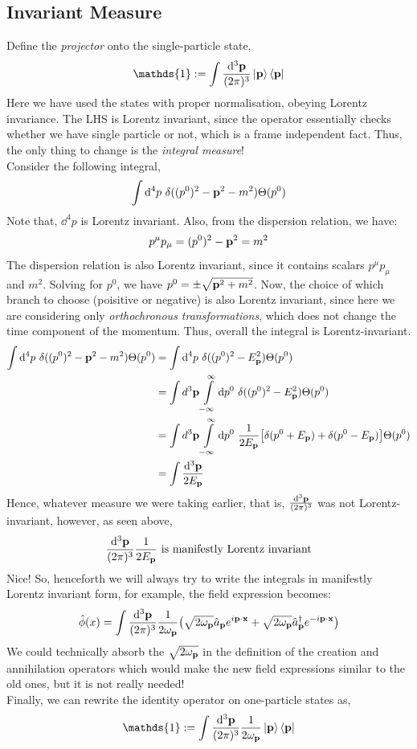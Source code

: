 \subsection{Invariant Measure}
Define the \textit{projector} onto the single-particle state,
$$\mathds{1} := \int \meas{\vb{p}} \ket{\vb{p}}\bra{\vb{p}}$$
Here we have used the states with proper normalisation, obeying Lorentz invariance. The LHS is Lorentz invariant, since the operator essentially checks whether we have single particle or not, which is a frame independent fact. Thus, the only thing to change is the \textit{integral measure}!\\[0.2cm]
Consider the following integral,
$$\int \dd^4 p \ \delta((p^0)^2 -\vb{{p}}^2- m^2) \Theta(p^0)$$
Note that, $\dd^4p$ is Lorentz invariant. Also, from the dispersion relation, we have:
$$p^\mu p_\mu = (p^0)^2 - \vb{{p}}^2 = m^2$$
The dispersion relation is also Lorentz invariant, since it contains scalars $p^\mu p_\mu$ and $m^2$. Solving for $p^0$, we have $p^0 = \pm\sqrt{\vb{{p}}^2 + m^2}$. Now, the choice of which branch to choose (poisitive or negative) is also Lorentz invariant, since here we are considering only \textit{orthochronous transformations}, which does not change the time component of the momentum. Thus, overall the integral is Lorentz-invariant.
\begin{align*}
   \int \dd^4 p \ \delta((p^0)^2 -\tvec{p}^2- m^2) \Theta(p^0)&=  \int \dd^4 p \ \delta((p^0)^2 -E_{\tvec{p}}^2)\Theta(p^0)\\
   &=\int d^3\vb{p} \int\limits_{-\infty}^\infty\dd p^0 \ \delta((p^0)^2 -E_{\tvec{p}}^2)\Theta(p^0) \\
   &=\int d^3\vb{p} \int\limits_{-\infty}^\infty \dd p^0 \ \frac{1}{2E_{\vb{p}}}\qty[\delta(p^0 +E_{\tvec{p}}) + \delta(p^0 -E_{\tvec{p}})]\Theta(p^0)\\
   &=\int\frac{ \dd^3\vb{p}}{2E_{\vb{p}}}
\end{align*}
Hence, whatever measure we were taking earlier, that is, $\frac{\dd^3\vb{{\vb{p}}}}{(2\pi)^3}$ was not Lorentz-invariant, however, as seen above,  $$\frac{ \dd^3\vb{p}}{(2\pi)^3}\frac{1}{2E_{\vb{p}}}\ \text{is manifestly Lorentz invariant}$$
Nice! So, henceforth we will always try to write the integrals in manifestly Lorentz invariant form, for example, the field expression becomes:
$$\hat{\phi}(x) = \int \frac{\dd^3\vb{{\vb{p}}}}{(2\pi)^3}\frac{1}{2\omega_{\vb{{p}}}}\qty(\sqrt{2\omega_{\vb{{p}}}} \hat{a}_{\vb{p}} e^{i \vb{p}\cdot \vb{x}} + \sqrt{2\omega_{\vb{{p}}}}\hat{a}_{\vb{p}}^\dagger e^{-i \vb{p}\cdot \vb{x}})$$
We could technically absorb the $\sqrt{2\omega_{\vb{{p}}}}$ in the definition of the creation and annihilation operators which would make the new field expressions similar to the old ones, but it is not really needed!\\[0.2cm]
Finally, we can rewrite the identity operator on one-particle states as,
$$\mathds{1} := \int \meas{\vb{p}}\frac{1}{2\omp} \ket{\vb{p}}\bra{\vb{p}}$$
